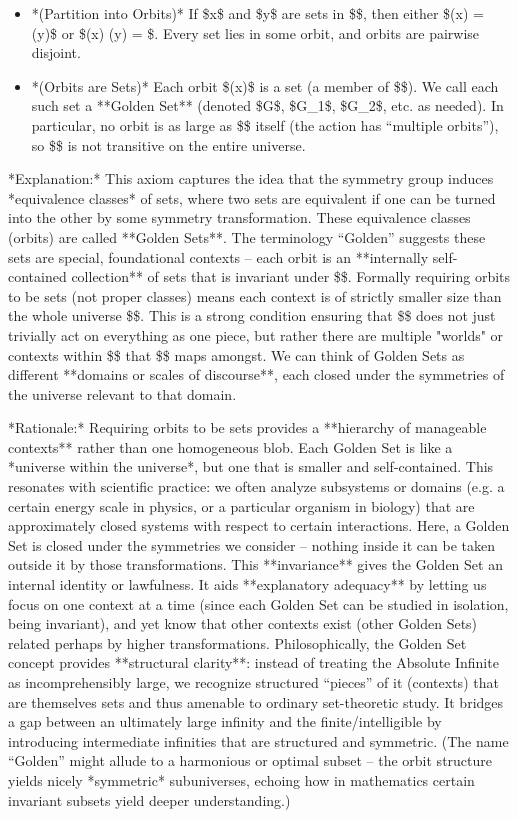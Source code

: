 \documentclass[11pt]{article}
\begin{document}
\begin{itemize}
  \item *(Partition into Orbits)* If \$x\$ and \$y\$ are sets in \$\infty\$, then either \$\Orb(x) = \Orb(y)\$ or \$\Orb(x) \cap \Orb(y) = \emptyset\$. Every set lies in some orbit, and orbits are pairwise disjoint.
  \item *(Orbits are Sets)* Each orbit \$\Orb(x)\$ is a set (a member of \$\infty\$). We call each such set a **Golden Set** (denoted \$G\$, \$G\_1\$, \$G\_2\$, etc. as needed). In particular, no orbit is as large as \$\infty\$ itself (the action has “multiple orbits”), so \$\Sym\$ is not transitive on the entire universe.

\end{itemize}
    *Explanation:* This axiom captures the idea that the symmetry group induces *equivalence classes* of sets, where two sets are equivalent if one can be turned into the other by some symmetry transformation. These equivalence classes (orbits) are called **Golden Sets**. The terminology “Golden” suggests these sets are special, foundational contexts – each orbit is an **internally self-contained collection** of sets that is invariant under \$\Sym\$. Formally requiring orbits to be sets (not proper classes) means each context is of strictly smaller size than the whole universe \$\infty\$. This is a strong condition ensuring that \$\Sym\$ does not just trivially act on everything as one piece, but rather there are multiple "worlds" or contexts within \$\infty\$ that \$\Sym\$ maps amongst. We can think of Golden Sets as different **domains or scales of discourse**, each closed under the symmetries of the universe relevant to that domain.

    *Rationale:* Requiring orbits to be sets provides a **hierarchy of manageable contexts** rather than one homogeneous blob. Each Golden Set is like a *universe within the universe*, but one that is smaller and self-contained. This resonates with scientific practice: we often analyze subsystems or domains (e.g. a certain energy scale in physics, or a particular organism in biology) that are approximately closed systems with respect to certain interactions. Here, a Golden Set is closed under the symmetries we consider – nothing inside it can be taken outside it by those transformations. This **invariance** gives the Golden Set an internal identity or lawfulness. It aids **explanatory adequacy** by letting us focus on one context at a time (since each Golden Set can be studied in isolation, being invariant), and yet know that other contexts exist (other Golden Sets) related perhaps by higher transformations. Philosophically, the Golden Set concept provides **structural clarity**: instead of treating the Absolute Infinite as incomprehensibly large, we recognize structured “pieces” of it (contexts) that are themselves sets and thus amenable to ordinary set-theoretic study. It bridges a gap between an ultimately large infinity and the finite/intelligible by introducing intermediate infinities that are structured and symmetric. (The name “Golden” might allude to a harmonious or optimal subset – the orbit structure yields nicely *symmetric* subuniverses, echoing how in mathematics certain invariant subsets yield deeper understanding.)
\end{document}
